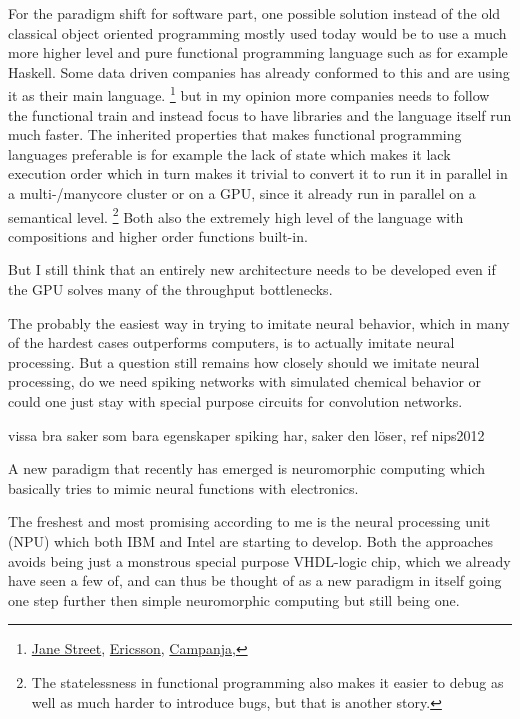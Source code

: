 \documentclass{article}
\begin{document}
    For the paradigm shift for software part,
    one possible solution instead of the old classical object oriented
    programming mostly used today would be to use a much more higher level and
    pure functional programming language such as
    for example Haskell. Some data driven companies has
    already conformed to this and are using it as their main language.
    \footnote{
        \href{http://www.janestreet.com}{Jane Street},
        \href{http://www.ericsson.com}{Ericsson},
        \href{http://www.campanja.com}{Campanja},
    }
    but in my opinion more companies needs to follow the functional train and
    instead focus to have libraries and the language itself run much faster.
    The inherited properties that makes functional programming languages 
    preferable is for example the lack of state 
    which makes it lack execution order which in turn makes it
    trivial to convert it to run it in parallel in a multi-/manycore cluster
    or on a GPU, since it already run in parallel on a semantical level.
    \footnote{The
    statelessness in functional programming also makes it easier to debug as
    well as much harder to introduce bugs, but that is another story.} 
    Both also the extremely high level of the language with
    compositions and higher order functions built-in.\cite{haskell}

    But I still think that an entirely new architecture needs to be developed 
    even if the GPU solves many of the throughput bottlenecks.
    
    The probably the easiest way in trying to imitate neural behavior, 
    which in many of the hardest cases outperforms computers, is to actually
    imitate neural processing. But a question still remains how closely should
    we imitate neural processing, do we need spiking networks with simulated
    chemical behavior or could one just stay with special purpose circuits 
    for convolution networks.

    vissa bra saker som bara egenskaper spiking har, saker den löser, ref nips2012

    A new paradigm that recently has emerged is neuromorphic
    computing which basically tries to mimic neural functions with electronics.
    
    The freshest and most promising according to me is the 
    neural processing unit (NPU) which both IBM\cite{synapse} and
    Intel\cite{intelneuro} are starting to develop. Both the approaches avoids being
    just a monstrous special purpose VHDL-logic chip, which we already have
    seen a few of, and can thus be thought of
    as a new paradigm in itself going one step further then simple neuromorphic
    computing but still being one.
\end{document}
